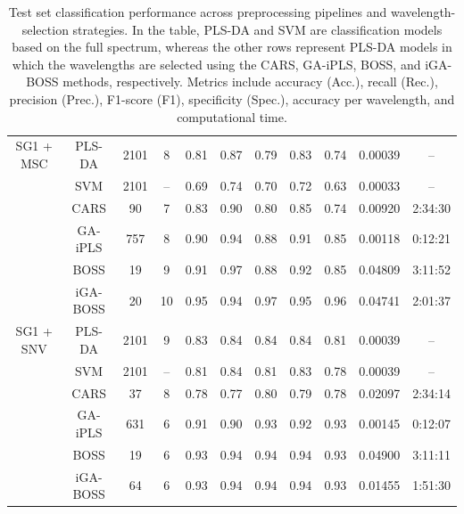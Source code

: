 \begin{table}[th!]
\begin{tabular}{ccccccccccc}
SG1 + MSC & PLS-DA    & 2101 & 8  & 0.81 & 0.87 & 0.79 & 0.83 & 0.74 & 0.00039 & --      \\
          & SVM       & 2101 & -- & 0.69 & 0.74 & 0.70 & 0.72 & 0.63 & 0.00033 & --      \\
          & CARS      & 90   & 7  & 0.83 & 0.90 & 0.80 & 0.85 & 0.74 & 0.00920 & 2:34:30 \\
          & GA-iPLS   & 757  & 8  & 0.90 & 0.94 & 0.88 & 0.91 & 0.85 & 0.00118 & 0:12:21 \\
          & BOSS      & 19   & 9  & 0.91 & 0.97 & 0.88 & 0.92 & 0.85 & 0.04809 & 3:11:52 \\
          & iGA-BOSS  & 20   & 10 & 0.95 & 0.94 & 0.97 & 0.95 & 0.96 & 0.04741 & 2:01:37 \\
\hline

SG1 + SNV & PLS-DA    & 2101 & 9  & 0.83 & 0.84 & 0.84 & 0.84 & 0.81 & 0.00039 & --      \\
          & SVM       & 2101 & -- & 0.81 & 0.84 & 0.81 & 0.83 & 0.78 & 0.00039 & --      \\
          & CARS      & 37   & 8  & 0.78 & 0.77 & 0.80 & 0.79 & 0.78 & 0.02097 & 2:34:14 \\
          & GA-iPLS   & 631  & 6  & 0.91 & 0.90 & 0.93 & 0.92 & 0.93 & 0.00145 & 0:12:07 \\
          & BOSS      & 19   & 6  & 0.93 & 0.94 & 0.94 & 0.94 & 0.93 & 0.04900 & 3:11:11 \\
          & iGA-BOSS  & 64   & 6  & 0.93 & 0.94 & 0.94 & 0.94 & 0.93 & 0.01455 & 1:51:30 \\
\hline

\end{tabular}

\caption{Test set classification performance across preprocessing pipelines and wavelength-selection strategies. 
In the table, PLS-DA and SVM are classification models based on the full spectrum, whereas the other rows represent PLS-DA models in which the wavelengths are selected using the CARS, GA-iPLS, BOSS, and iGA-BOSS methods, respectively.
Metrics include accuracy (Acc.), recall (Rec.), precision (Prec.), F1-score (F1), specificity (Spec.), accuracy per wavelength, and computational time.}
\label{tab:results}
\end{table}
